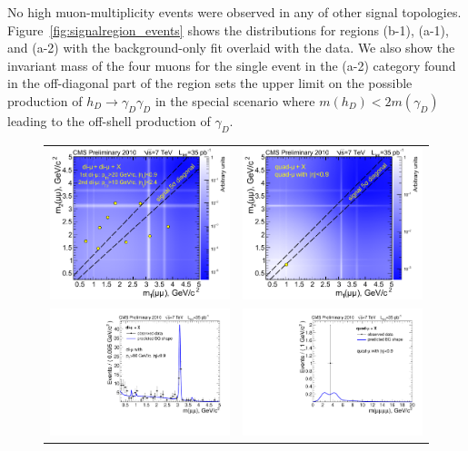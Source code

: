No high muon-multiplicity events
were observed in any of other signal topologies. Figure~\ref{fig:signalregion_events} shows
the distributions for regions (b-1), (a-1), and (a-2) with the background-only fit overlaid 
with the data.  We also show the invariant mass of the four muons for the single event in the \mbox{(a-2)} category 
found in the off-diagonal part of the region sets the upper limit on the possible production of 
$h_D \to \gamma_D \gamma_D$ in the special scenario where $m(h_D)<2 m(\gamma_D)$ leading to 
the off-shell production of $\gamma_D$. 

\begin{figure}[tbh]
\centering
\begin{tabular}{cc}
\includegraphics[width=0.4\linewidth]{PLOTS/sig_data_bg_b1.pdf} &
\includegraphics[width=0.4\linewidth]{PLOTS/sig_data_bg_a2.pdf} \\
\includegraphics[width=0.4\linewidth]{PLOTS/sig_data_bg_a1.pdf} & 
\includegraphics[width=0.4\linewidth]{PLOTS/sig_data_bg_a2_inv.pdf}\\

\end{tabular}
\end{figure}

